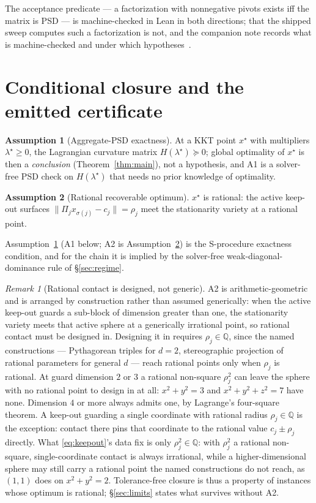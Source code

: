\documentclass[11pt]{article}
\theoremstyle{definition}
\newtheorem{assumption}{Assumption}
\theoremstyle{remark}
\newtheorem{remark}{Remark}
\newcommand{\Q}{\mathbb{Q}}
\renewcommand{\_}{\ifdim\fontdimen3\font=0pt\relax\char`\_\else\textunderscore\fi\hspace{0pt}}
\begin{document}
The acceptance predicate --- a factorization with nonnegative pivots exists
iff the matrix is PSD --- is machine-checked in Lean in both directions; that
the shipped sweep computes such a factorization is not, and the companion note
records what is machine-checked and under which
hypotheses~\cite{leannote}.

\section{Conditional closure and the emitted certificate}\label{sec:theorem}
\begin{assumption}[Aggregate-PSD exactness]\label{a:psd}
At a KKT point $x^\star$ with multipliers $\lambda^\star\ge0$, the Lagrangian
curvature matrix $H(\lambda^\star)\succeq0$; global optimality of $x^\star$ is
then a \emph{conclusion} (Theorem~\ref{thm:main}), not a hypothesis, and A1 is
a solver-free PSD check on $H(\lambda^\star)$ that needs no prior knowledge of
optimality.
\end{assumption}
\begin{assumption}[Rational recoverable optimum]\label{a:rat}
$x^\star$ is rational: the active keep-out surfaces
$\lVert\Pi_jx_{\sigma(j)}-c_j\rVert=\rho_j$ meet the stationarity variety at a
rational point.
\end{assumption}

\noindent Assumption~\ref{a:psd} (A1 below; A2 is Assumption~\ref{a:rat}) is
the S-procedure exactness condition, and for the chain it is implied by the
solver-free weak-diagonal-dominance rule of \S\ref{sec:regime}.

\begin{remark}[Rational contact is designed, not generic]\label{rem:contact}
A2 is arithmetic-geometric and is arranged by construction rather than assumed
generically: when the active keep-out guards a sub-block of dimension greater
than one, the stationarity variety meets that active sphere at a generically
irrational point, so rational contact must be designed in. Designing it in
requires $\rho_j\in\Q$, since the named constructions --- Pythagorean
triples for $d=2$, stereographic projection of rational parameters for general
$d$ --- reach rational points only when $\rho_j$ is rational. At guard
dimension $2$ or $3$ a rational non-square $\rho_j^2$ can leave the sphere
with no rational point to design in at all: $x^2+y^2=3$ and
$x^2+y^2+z^2=7$ have none. Dimension $4$ or more always admits one, by
Lagrange's four-square theorem. A keep-out guarding a single coordinate
with rational radius $\rho_j\in\Q$ is the exception: contact there pins that
coordinate to the rational value $c_j\pm\rho_j$ directly. What
\eqref{eq:keepout}'s data fix is only $\rho_j^2\in\Q$: with $\rho_j^2$ a
rational non-square, single-coordinate contact is always irrational, while a
higher-dimensional sphere may still carry a rational point the named
constructions do not reach, as $(1,1)$ does on $x^2+y^2=2$.
Tolerance-free closure is thus a property of instances whose optimum is
rational; \S\ref{sec:limits} states what survives without A2.
\end{remark}
\end{document}
